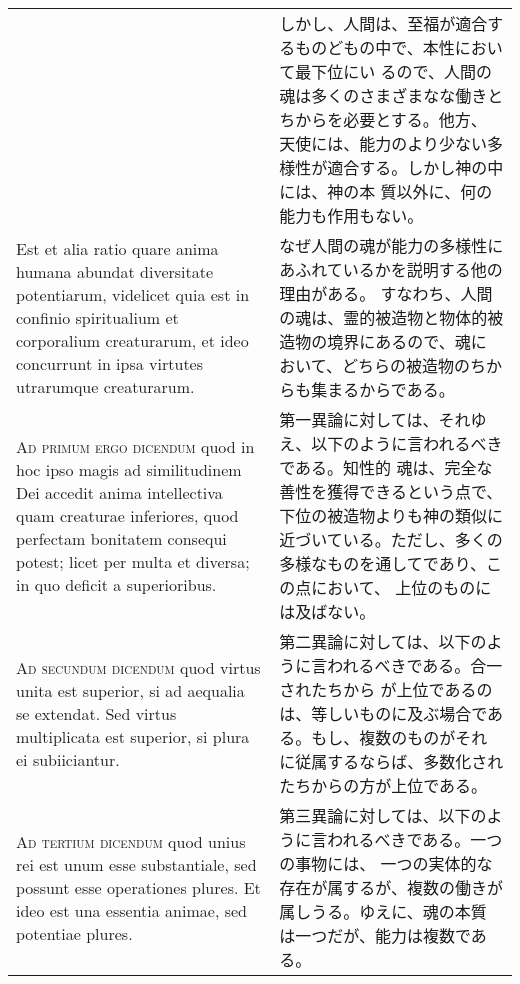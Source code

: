 \documentclass[paper=a4paper,fontsize=10pt,jafontsize=9pt,titlepage]{jlreq}
\begin{document}
\begin{longtable}{p{21em}p{21em}}
 &

 しかし、人間は、至福が適合するものどもの中で、本性において最下位にい
 るので、人間の魂は多くのさまざまなな働きとちからを必要とする。他方、
 天使には、能力のより少ない多様性が適合する。しかし神の中には、神の本
 質以外に、何の能力も作用もない。


\\

 Est et alia ratio quare anima humana abundat diversitate potentiarum,
 videlicet quia est in confinio spiritualium et corporalium
 creaturarum, et ideo concurrunt in ipsa virtutes utrarumque
 creaturarum.

 &

 なぜ人間の魂が能力の多様性にあふれているかを説明する他の理由がある。
 すなわち、人間の魂は、霊的被造物と物体的被造物の境界にあるので、魂に
 おいて、どちらの被造物のちからも集まるからである。

 

\\

 {\scshape Ad primum ergo dicendum} quod in hoc ipso magis ad
 similitudinem Dei accedit anima intellectiva quam creaturae
 inferiores, quod perfectam bonitatem consequi potest; licet per multa
 et diversa; in quo deficit a superioribus.

 &

 第一異論に対しては、それゆえ、以下のように言われるべきである。知性的
 魂は、完全な善性を獲得できるという点で、下位の被造物よりも神の類似に
 近づいている。ただし、多くの多様なものを通してであり、この点において、
 上位のものには及ばない。

\\


 {\scshape Ad secundum dicendum} quod virtus unita est superior, si ad
 aequalia se extendat. Sed virtus multiplicata est superior, si plura
 ei subiiciantur.

 &

 第二異論に対しては、以下のように言われるべきである。合一されたちから
 が上位であるのは、等しいものに及ぶ場合である。もし、複数のものがそれ
 に従属するならば、多数化されたちからの方が上位である。
 
\\

 {\scshape Ad tertium dicendum} quod unius rei est unum esse
 substantiale, sed possunt esse operationes plures. Et ideo est una
 essentia animae, sed potentiae plures.

 &

 第三異論に対しては、以下のように言われるべきである。一つの事物には、
 一つの実体的な存在が属するが、複数の働きが属しうる。ゆえに、魂の本質
 は一つだが、能力は複数である。


\end{longtable}
\newpage
 
\end{document}
